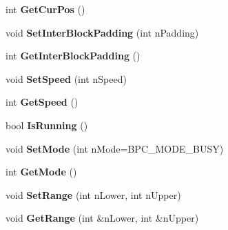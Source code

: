 \begin{DoxyCompactItemize}
\item 
\hypertarget{class_cx_prog_ctrl_af072a15c205b23672ea89064b8048a65}{int {\bfseries Get\-Cur\-Pos} ()}\label{class_cx_prog_ctrl_af072a15c205b23672ea89064b8048a65}

\item 
\hypertarget{class_cx_prog_ctrl_ad62ed9d8ef5efb9082171963dec8b30f}{void {\bfseries Set\-Inter\-Block\-Padding} (int n\-Padding)}\label{class_cx_prog_ctrl_ad62ed9d8ef5efb9082171963dec8b30f}

\item 
\hypertarget{class_cx_prog_ctrl_a952dfb39b611633f7140a7a45fd77ec5}{int {\bfseries Get\-Inter\-Block\-Padding} ()}\label{class_cx_prog_ctrl_a952dfb39b611633f7140a7a45fd77ec5}

\item 
\hypertarget{class_cx_prog_ctrl_af8aebf1ccd5502dab183345ad4e80c04}{void {\bfseries Set\-Speed} (int n\-Speed)}\label{class_cx_prog_ctrl_af8aebf1ccd5502dab183345ad4e80c04}

\item 
\hypertarget{class_cx_prog_ctrl_ad03cd2aa90a9330268da8b9369fa6b58}{int {\bfseries Get\-Speed} ()}\label{class_cx_prog_ctrl_ad03cd2aa90a9330268da8b9369fa6b58}

\item 
\hypertarget{class_cx_prog_ctrl_a3be8efcd730322997c8bb2eb9cf91b93}{bool {\bfseries Is\-Running} ()}\label{class_cx_prog_ctrl_a3be8efcd730322997c8bb2eb9cf91b93}

\item 
\hypertarget{class_cx_prog_ctrl_aaaab76682a2f0c0f942a02779d67f5a1}{void {\bfseries Set\-Mode} (int n\-Mode=B\-P\-C\-\_\-\-M\-O\-D\-E\-\_\-\-B\-U\-S\-Y)}\label{class_cx_prog_ctrl_aaaab76682a2f0c0f942a02779d67f5a1}

\item 
\hypertarget{class_cx_prog_ctrl_a1684380a1a86ccbdd881fb1e3dc91d9c}{int {\bfseries Get\-Mode} ()}\label{class_cx_prog_ctrl_a1684380a1a86ccbdd881fb1e3dc91d9c}

\item 
\hypertarget{class_cx_prog_ctrl_a2b65ca3c3919a9a57618535ebd9e8a06}{void {\bfseries Set\-Range} (int n\-Lower, int n\-Upper)}\label{class_cx_prog_ctrl_a2b65ca3c3919a9a57618535ebd9e8a06}

\item 
\hypertarget{class_cx_prog_ctrl_a8494fd0f547124cffd5553dc28d8fc39}{void {\bfseries Get\-Range} (int \&n\-Lower, int \&n\-Upper)}\label{class_cx_prog_ctrl_a8494fd0f547124cffd5553dc28d8fc39}


\end{DoxyCompactItemize}
